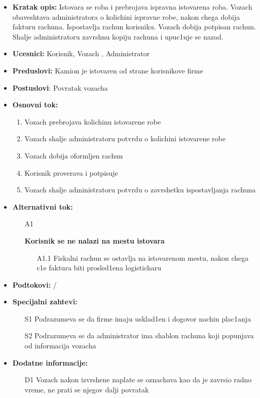 \begin{itemize}
	\item {\textbf{Kratak opis:}  Istovara se roba i prebrojava ispravna istovarena roba. Vozach obaveshtava administratora o kolichini ispravne robe, nakon chega dobija fakturu rachuna. Ispostavlja rachun korisniku. Vozach dobija potpisan rachun. Shalje administratoru zavrshnu kopiju rachuna i upuc1uje se nazad.}
	\item{\textbf{Ucesnici:} Korisnik, Vozach , Administrator}
	\item{\textbf{Preduslovi:} Kamion je istovaren od strane korisnikove firme }
	\item{\textbf{Postuslovi}: Povratak vozacha}
	\item{\textbf{Osnovni tok:}  \begin{enumerate}
				\item {Vozach prebrojava kolichinu istovarene robe}
				\item{Vozach shalje administratoru potvrdu o kolichini istovarene robe}
				\item{Vozach dobija oformljen rachun}
				\item {Korisnik proverava i potpisuje}
				\item{Vozach shalje administratoru potvrdu o zavrshetku ispostavljanja rachuna}
	\end{enumerate}
			}
\item{\textbf{Alternativni tok:}
	 \begin{enumerate}
		\item[A{1}]{\textbf{Korisnik se ne nalazi na mestu istovara} 
			\begin{itemize}
				\item[A{1.1}]{Fiskalni rachun se ostavlja na istovarenom mestu, nakon chega c1e faktura biti prosled1ena logisticharu}
			\end{itemize}	
						}
	\end{enumerate}
		}
\item{\textbf{Podtokovi:} /}
\item{\textbf{Specijalni zahtevi:} 
			\begin{itemize}
				\item[S{1}]{Podrazumeva se da firme imaju usklad1en i dogovor nachin plac1anja}
				\item[S{2}]{Podrazumeva se da administrator ima shablon rachuna koji popunjava od informacija vozacha}
		\end{itemize}
	
}
\item{\textbf{Dodatne informacije:} 
					\begin{itemize}
						\item[D{1}]{Vozach nakon izvrshene naplate se oznachava kao da je zavrsio radno vreme, ne prati se njegov dalji povratak}
					\end{itemize}
}

\end{itemize}
